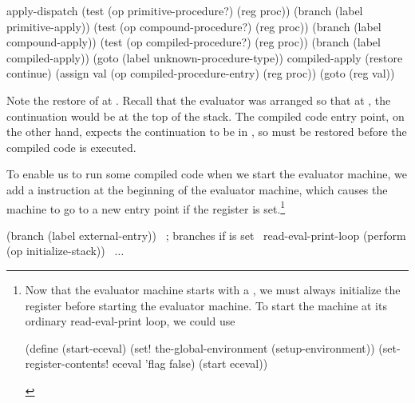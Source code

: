 \begin{codeBlock}
apply-dispatch
  (test (op primitive-procedure?) (reg proc))
  (branch (label primitive-apply))
  (test (op compound-procedure?) (reg proc))
  (branch (label compound-apply))
  (test (op compiled-procedure?) (reg proc))
  (branch (label compiled-apply))
  (goto (label unknown-procedure-type))
compiled-apply
  (restore continue)
  (assign val (op compiled-procedure-entry) (reg proc))
  (goto (reg val))
\end{codeBlock}

\noindent
Note the restore of  at .  Recall that the
evaluator was arranged so that at , the continuation would
be at the top of the stack.  The compiled code entry point, on the other hand,
expects the continuation to be in , so  must be
restored before the compiled code is executed.

To enable us to run some compiled code when we start the evaluator machine, we
add a  instruction at the beginning of the evaluator machine,
which causes the machine to go to a new entry point if the  register
is set.\footnote{Now that the evaluator machine starts with a , we
must always initialize the  register before starting the evaluator
machine.  To start the machine at its ordinary read-eval-print loop, we could
use

\begin{compactCodeBlock}
(define (start-eceval)
  (set! the-global-environment (setup-environment))
  (set-register-contents! eceval 'flag false)
  (start eceval))
\end{compactCodeBlock}
}

\begin{codeBlock}
(branch (label external-entry))      ~\textrm{; branches if  is set}~
read-eval-print-loop
  (perform (op initialize-stack))
  ~\( \dots \)~
\end{codeBlock}

